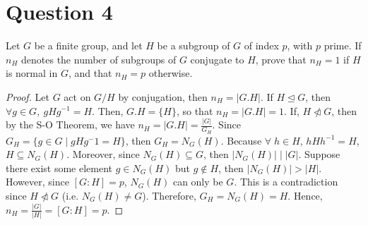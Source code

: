 \section{Question 4}

\begin{question}
    Let $G$ be a finite group, and let $H$ be a subgroup of $G$ of index $p$, with $p$ prime. If $n_H$ denotes the number of subgroups of $G$ conjugate to $H$, prove that $n_H=1$ if $H$ is normal in $G$, and that $n_H=p$ otherwise.
\end{question}

\begin{answer}
    \begin{proof}
        Let $G$ act on $G/H$ by conjugation, then $n_H = \lvert G.H \lvert$. If $H \trianglelefteq G$, then $\forall g \in G,\ gHg^{-1} = H$. Then, $G.H = \{H\}$, so that $n_H = \lvert G.H \rvert = 1$. If, $H \ntriangleleft G$, then by the S-O Theorem, we have $n_H = \lvert G.H \rvert = \tfrac{\lvert G \rvert}{G_H}$. Since $G_H = \{g \in G \mid gHg^-1 = H\}$, then $G_H = N_G(H)$. Because $\forall \; h \in H$, $hHh^{-1} = H$, $H \subseteq N_G(H)$. Moreover, since $N_G(H) \subseteq G$, then $\lvert N_G(H) \rvert \mid \lvert G \rvert$. Suppose there exist some element $g \in N_G(H)$ but $g \notin H$, then $\lvert N_G(H) \rvert > \lvert H \rvert$. However, since $[G:H] = p$, $N_G(H)$ can only be $G$. This is a contradiction since $H \ntriangleleft G$ (i.e. $N_G(H) \neq G$). Therefore, $G_H = N_G(H) = H$. Hence, $n_H = \tfrac{\lvert G \rvert}{\lvert H \rvert} = [G:H] = p$.
    \end{proof}
\end{answer}